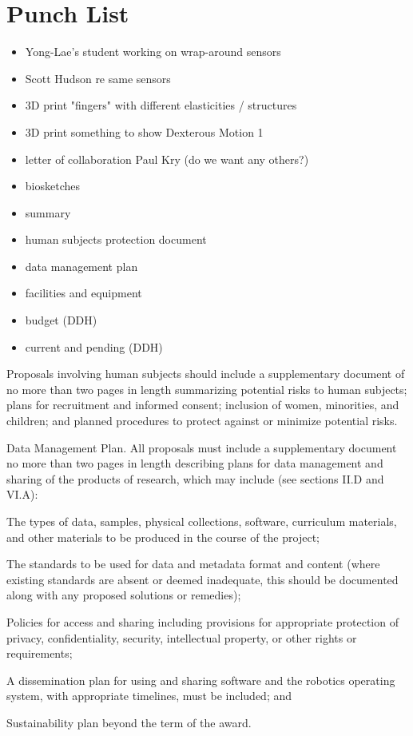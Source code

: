 \section{Punch List}

\begin{itemize}

\item Yong-Lae's student working on wrap-around sensors
\item Scott Hudson re same sensors
\item 3D print "fingers" with different elasticities / structures
\item 3D print something to show Dexterous Motion 1
\item letter of collaboration Paul Kry (do we want any others?)
\item biosketches
\item summary
\item human subjects protection document
\item data management plan
\item facilities and equipment
\item budget (DDH)
\item current and pending (DDH)

\end{itemize}




Proposals involving human subjects should include a supplementary document of no more than two pages in length summarizing potential risks to human subjects; plans for recruitment and informed consent; inclusion of women, minorities, and children; and planned procedures to protect against or minimize potential risks.

Data Management Plan. All proposals must include a supplementary document no more than two pages in length describing plans for data management and sharing of the products of research, which may include (see sections II.D and VI.A):

    The types of data, samples, physical collections, software, curriculum materials, and other materials to be produced in the course of the project;

    The standards to be used for data and metadata format and content (where existing standards are absent or deemed inadequate, this should be documented along with any proposed solutions or remedies);

    Policies for access and sharing including provisions for appropriate protection of privacy, confidentiality, security, intellectual property, or other rights or requirements;

    A dissemination plan for using and sharing software and the robotics operating system, with appropriate timelines, must be included; and

    Sustainability plan beyond the term of the award.